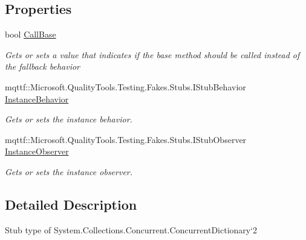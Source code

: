 \subsection*{Properties}
\begin{DoxyCompactItemize}
\item 
bool \hyperlink{class_system_1_1_collections_1_1_concurrent_1_1_fakes_1_1_stub_concurrent_dictionary_3_01_t_key_00_01_t_value_01_4_addb3e180a864fb991fa67be2def312f8}{Call\-Base}
\begin{DoxyCompactList}\small\item\em Gets or sets a value that indicates if the base method should be called instead of the fallback behavior\end{DoxyCompactList}\item 
mqttf\-::\-Microsoft.\-Quality\-Tools.\-Testing.\-Fakes.\-Stubs.\-I\-Stub\-Behavior \hyperlink{class_system_1_1_collections_1_1_concurrent_1_1_fakes_1_1_stub_concurrent_dictionary_3_01_t_key_00_01_t_value_01_4_a5e576a7ce80dcd46675fc7ad7325bed7}{Instance\-Behavior}
\begin{DoxyCompactList}\small\item\em Gets or sets the instance behavior.\end{DoxyCompactList}\item 
mqttf\-::\-Microsoft.\-Quality\-Tools.\-Testing.\-Fakes.\-Stubs.\-I\-Stub\-Observer \hyperlink{class_system_1_1_collections_1_1_concurrent_1_1_fakes_1_1_stub_concurrent_dictionary_3_01_t_key_00_01_t_value_01_4_a032e3faad1e8c77e623adca9fc867e67}{Instance\-Observer}
\begin{DoxyCompactList}\small\item\em Gets or sets the instance observer.\end{DoxyCompactList}\end{DoxyCompactItemize}


\subsection{Detailed Description}
Stub type of System.\-Collections.\-Concurrent.\-Concurrent\-Dictionary`2



